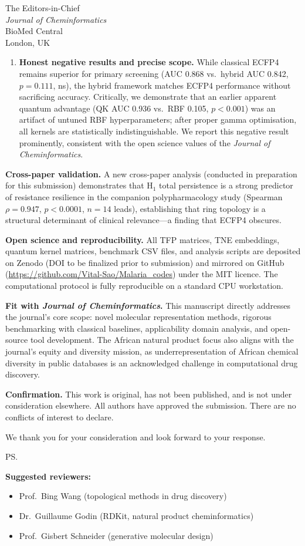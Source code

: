 \documentclass[11pt,a4paper]{letter}
\begin{document}
\begin{letter}{%
  The Editors-in-Chief \\
  \textit{Journal of Cheminformatics} \\
  BioMed Central \\
  London, UK
}
\begin{enumerate}[leftmargin=*, itemsep=4pt]
  \item \textbf{Honest negative results and precise scope.}  
  While classical ECFP4 remains superior for primary screening (AUC 0.868 vs.\ hybrid AUC 0.842, $p = 0.111$, ns), the hybrid framework matches ECFP4 performance without sacrificing accuracy. Critically, we demonstrate that an earlier apparent quantum advantage (QK AUC 0.936 vs.\ RBF 0.105, $p < 0.001$) was an artifact of untuned RBF hyperparameters; after proper gamma optimisation, all kernels are statistically indistinguishable. We report this negative result prominently, consistent with the open science values of the \textit{Journal of Cheminformatics}.
\end{enumerate}

\medskip
\textbf{Cross-paper validation.} A new cross-paper analysis (conducted in preparation for this submission) demonstrates that H$_1$ total persistence is a strong predictor of resistance resilience in the companion polypharmacology study (Spearman $\rho = 0.947$, $p < 0.0001$, $n = 14$ leads), establishing that ring topology is a structural determinant of clinical relevance---a finding that ECFP4 obscures.

\medskip
\textbf{Open science and reproducibility.} All TFP matrices, TNE embeddings, quantum kernel matrices, benchmark CSV files, and analysis scripts are deposited on Zenodo (DOI to be finalized prior to submission) and mirrored on GitHub (\url{https://github.com/Vital-Sao/Malaria_codes}) under the MIT licence. The computational protocol is fully reproducible on a standard CPU workstation.

\medskip
\textbf{Fit with \textit{Journal of Cheminformatics}.} This manuscript directly addresses the journal's core scope: novel molecular representation methods, rigorous benchmarking with classical baselines, applicability domain analysis, and open-source tool development. The African natural product focus also aligns with the journal's equity and diversity mission, as underrepresentation of African chemical diversity in public databases is an acknowledged challenge in computational drug discovery.

\medskip
\textbf{Confirmation.} This work is original, has not been published, and is not under consideration elsewhere. All authors have approved the submission. There are no conflicts of interest to declare.

\closing{We thank you for your consideration and look forward to your response.}

\ps{%
\textbf{Suggested reviewers:}\\
\begin{itemize}[leftmargin=*, itemsep=2pt]
  \item Prof.\ Bing Wang (topological methods in drug discovery)
  \item Dr.\ Guillaume Godin (RDKit, natural product cheminformatics)
  \item Prof.\ Gisbert Schneider (generative molecular design)
\end{itemize}
}

\end{letter}
\end{document}
